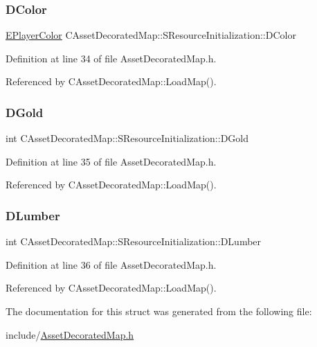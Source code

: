 \subsubsection{\texorpdfstring{D\+Color}{DColor}}
{\footnotesize\ttfamily \hyperlink{GameDataTypes_8h_aafb0ca75933357ff28a6d7efbdd7602f}{E\+Player\+Color} C\+Asset\+Decorated\+Map\+::\+S\+Resource\+Initialization\+::\+D\+Color}



Definition at line 34 of file Asset\+Decorated\+Map.\+h.



Referenced by C\+Asset\+Decorated\+Map\+::\+Load\+Map().

\hypertarget{structCAssetDecoratedMap_1_1SResourceInitialization_ad47be91c742a06b57bd3a97010625857}{}\label{structCAssetDecoratedMap_1_1SResourceInitialization_ad47be91c742a06b57bd3a97010625857} 
\subsubsection{\texorpdfstring{D\+Gold}{DGold}}
{\footnotesize\ttfamily int C\+Asset\+Decorated\+Map\+::\+S\+Resource\+Initialization\+::\+D\+Gold}



Definition at line 35 of file Asset\+Decorated\+Map.\+h.



Referenced by C\+Asset\+Decorated\+Map\+::\+Load\+Map().

\hypertarget{structCAssetDecoratedMap_1_1SResourceInitialization_a4592777f741383161a49bce10f2c1932}{}\label{structCAssetDecoratedMap_1_1SResourceInitialization_a4592777f741383161a49bce10f2c1932} 
\subsubsection{\texorpdfstring{D\+Lumber}{DLumber}}
{\footnotesize\ttfamily int C\+Asset\+Decorated\+Map\+::\+S\+Resource\+Initialization\+::\+D\+Lumber}



Definition at line 36 of file Asset\+Decorated\+Map.\+h.



Referenced by C\+Asset\+Decorated\+Map\+::\+Load\+Map().



The documentation for this struct was generated from the following file\+:\begin{DoxyCompactItemize}
\item 
include/\hyperlink{AssetDecoratedMap_8h}{Asset\+Decorated\+Map.\+h}\end{DoxyCompactItemize}
